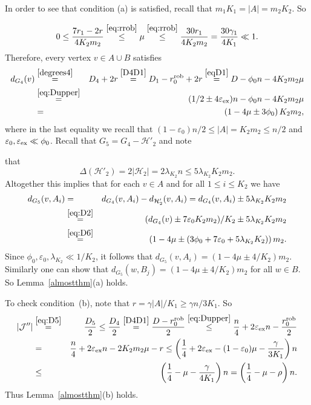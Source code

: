 \documentclass{memo-l}
\def\COMMENT#1{}
\def\eps{\varepsilon}
\def\cJ{\mathcal{J}}
\numberwithin{section}{chapter}
\numberwithin{equation}{section}
\numberwithin{firstthm}{section}
\numberwithin{figure}{section}
\begin{document}
{In order to see that condition (a) is satisfied, recall that
$m_1K_1=|A|=m_2K_2$. So%
\COMMENT{Deryk replaced lower bound on $\mu$ with 0 and replaced upper bound with $1$ rather than $\eps$ (as statement of
approx lemma changed slightly} 
$$
0\le \frac{7r_1-2r}{4K_2m_2}\stackrel{\eqref{eq:rrob}}{\le} \mu 
\stackrel{\eqref{eq:rrob}}{\le} \frac{30r_1}{4K_2m_2}
= \frac{30\gamma_1 }{4K_1}\ll 1.
$$
Therefore, every vertex $v\in A \cup B$ satisfies
\begin{eqnarray}
d_{G_4}(v) & \stackrel{\eqref{degrees4}}{=} & D_4+2r 
\stackrel{\eqref{D4D1}}{=} D_1-r^{\rm rob}_0+2r
 \stackrel{\eqref{eqD1}}{=}  D - \phi_0 n - 4 K_2 m _2 \mu \nonumber \\
 & \stackrel{\eqref{eq:Dupper}}{ = } & (1/2  \pm 4 \eps_{\rm ex} ) n - \phi_0 n - 4 K_2 m _2 \mu \nonumber \\
& = & \left( 1-4\mu \pm 3 \phi_0 \right)   K_2 m_2, 
 \label{eq:D6}
\end{eqnarray}
where in the last equality we recall that $(1-\eps_0) n /2 \le |A| = K_2 m_2 \le n/2$ and $\eps_0 ,  \eps_{\rm ex} \ll \phi_0$.
Recall that $G_5=G_4-\mathcal{H}'_2$ and note%
\COMMENT{Deryk replaced first inequality with $=$}
that
$$
\Delta(\mathcal{H}'_2) = 2 | \mathcal{H}_2 | =2 \lambda_{K_2} n \le 5 \lambda_{K_2}  K_2m_2.
$$
Altogether this implies that for each $v \in A$ and for all $1 \le i \le K_2$ we have
\begin{eqnarray*}
	d_{G_5} (v, A_i) & = & d_{G_4} (v,A_i) - d_{\mathcal{H}'_2} (v,A_i) 
= d_{G_4} (v,A_i) \pm 5 \lambda_{K_2}  K_2m_2 \\
	& \stackrel{ \eqref{eq:D2}}{=} &	( d_{G_4} (v) \pm 7 \eps_0 K_2 m_2  )/K_2 \pm 5 \lambda_{K_2}  K_2m_2 \\
	& \stackrel{\eqref{eq:D6}}{=} &	\left( 1-4\mu \pm (3 \phi_0 + 7 \eps_0 + 5 \lambda_{K_2}  K_2) \right)  m_2.
\end{eqnarray*}
Since $\phi_0, \eps_0, \lambda_{K_2}  \ll 1/K_2$, it follows that $d_{G_5}(v,A_i)=(1-4\mu\pm 4/K_2)m_2$. Similarly
one can show that $d_{G_5}(w,B_j)=(1-4\mu\pm 4/K_2)m_2$ for all $w\in B$. So Lemma~\ref{almostthm}(a) holds.

To check condition~(b), note that $r= \gamma |A|/K_1 \ge \gamma n/3K_1$. So 
\begin{eqnarray*}
|\cJ''| & \stackrel{\eqref{eq:D5}}{=} & \frac{D_5}{2} \le \frac{D_4}{2}
\stackrel{\eqref{D4D1}}{=}  \frac{D-r^{\rm rob}_0}{2} 
\stackrel{\eqref{eq:Dupper}}{\le} \frac{n}4 + 2 \eps_{\rm ex} n - \frac{r^{\rm rob}_0}{2} \\
& =  &\frac{n}4 + 2 \eps_{\rm ex} n - 2 K_2 m_2  \mu - r 
 \le  \left( \frac{1}{4} + 2 \eps_{\rm ex} -  (1- \eps_0)\mu - \frac{\gamma}{3 K_1}\right)n \\
& \le  & \left( \frac{1}{4}- \mu - \frac{\gamma}{4 K_1}  \right) n = \left( \frac{1}{4}- \mu - \rho  \right) n.
\end{eqnarray*}
Thus Lemma~\ref{almostthm}(b) holds.

}
\end{document}

